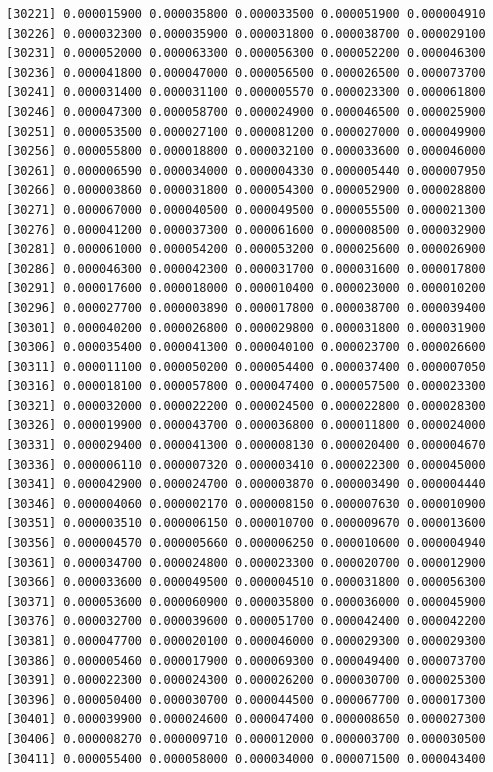 \documentclass[]{article}
\begin{document}
\begin{verbatim}
[30221] 0.000015900 0.000035800 0.000033500 0.000051900 0.000004910
[30226] 0.000032300 0.000035900 0.000031800 0.000038700 0.000029100
[30231] 0.000052000 0.000063300 0.000056300 0.000052200 0.000046300
[30236] 0.000041800 0.000047000 0.000056500 0.000026500 0.000073700
[30241] 0.000031400 0.000031100 0.000005570 0.000023300 0.000061800
[30246] 0.000047300 0.000058700 0.000024900 0.000046500 0.000025900
[30251] 0.000053500 0.000027100 0.000081200 0.000027000 0.000049900
[30256] 0.000055800 0.000018800 0.000032100 0.000033600 0.000046000
[30261] 0.000006590 0.000034000 0.000004330 0.000005440 0.000007950
[30266] 0.000003860 0.000031800 0.000054300 0.000052900 0.000028800
[30271] 0.000067000 0.000040500 0.000049500 0.000055500 0.000021300
[30276] 0.000041200 0.000037300 0.000061600 0.000008500 0.000032900
[30281] 0.000061000 0.000054200 0.000053200 0.000025600 0.000026900
[30286] 0.000046300 0.000042300 0.000031700 0.000031600 0.000017800
[30291] 0.000017600 0.000018000 0.000010400 0.000023000 0.000010200
[30296] 0.000027700 0.000003890 0.000017800 0.000038700 0.000039400
[30301] 0.000040200 0.000026800 0.000029800 0.000031800 0.000031900
[30306] 0.000035400 0.000041300 0.000040100 0.000023700 0.000026600
[30311] 0.000011100 0.000050200 0.000054400 0.000037400 0.000007050
[30316] 0.000018100 0.000057800 0.000047400 0.000057500 0.000023300
[30321] 0.000032000 0.000022200 0.000024500 0.000022800 0.000028300
[30326] 0.000019900 0.000043700 0.000036800 0.000011800 0.000024000
[30331] 0.000029400 0.000041300 0.000008130 0.000020400 0.000004670
[30336] 0.000006110 0.000007320 0.000003410 0.000022300 0.000045000
[30341] 0.000042900 0.000024700 0.000003870 0.000003490 0.000004440
[30346] 0.000004060 0.000002170 0.000008150 0.000007630 0.000010900
[30351] 0.000003510 0.000006150 0.000010700 0.000009670 0.000013600
[30356] 0.000004570 0.000005660 0.000006250 0.000010600 0.000004940
[30361] 0.000034700 0.000024800 0.000023300 0.000020700 0.000012900
[30366] 0.000033600 0.000049500 0.000004510 0.000031800 0.000056300
[30371] 0.000053600 0.000060900 0.000035800 0.000036000 0.000045900
[30376] 0.000032700 0.000039600 0.000051700 0.000042400 0.000042200
[30381] 0.000047700 0.000020100 0.000046000 0.000029300 0.000029300
[30386] 0.000005460 0.000017900 0.000069300 0.000049400 0.000073700
[30391] 0.000022300 0.000024300 0.000026200 0.000030700 0.000025300
[30396] 0.000050400 0.000030700 0.000044500 0.000067700 0.000017300
[30401] 0.000039900 0.000024600 0.000047400 0.000008650 0.000027300
[30406] 0.000008270 0.000009710 0.000012000 0.000003700 0.000030500
[30411] 0.000055400 0.000058000 0.000034000 0.000071500 0.000043400

\end{verbatim}
\end{document}
